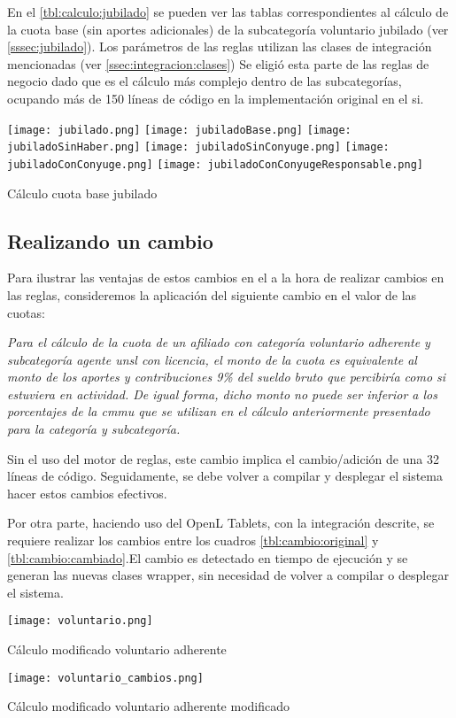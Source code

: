 En el \cref{tbl:calculo:jubilado} se pueden ver las tablas correspondientes al cálculo de la cuota base (sin aportes adicionales) de la subcategoría voluntario jubilado (ver \cref{sssec:jubilado}). Los parámetros de las reglas utilizan las clases de integración mencionadas (ver \cref{ssec:integracion:clases}) Se eligió esta parte de las reglas de negocio dado que es el cálculo más complejo dentro de las subcategorías, ocupando más de 150 líneas de código en la implementación original en el \acrshort{si}.

\begin{table*}
    \centering
    \texttt{[image: jubilado.png]}
    \texttt{[image: jubiladoBase.png]}
    \texttt{[image: jubiladoSinHaber.png]}
    \texttt{[image: jubiladoSinConyuge.png]}
    \texttt{[image: jubiladoConConyuge.png]}
    \texttt{[image: jubiladoConConyugeResponsable.png]}
    \caption{Cálculo cuota base jubilado}
    \label{tbl:calculo:jubilado}
\end{table*}

\subsection{Realizando un cambio}
Para ilustrar las ventajas de estos cambios en el \SIDOSPU a la hora de realizar cambios en las reglas, consideremos la aplicación del siguiente cambio en el valor de las cuotas:

\emph{
Para el cálculo de la cuota de un afiliado con categoría voluntario adherente y subcategoría agente \acrshort{unsl} con licencia, el monto de la cuota es equivalente al monto de los aportes y contribuciones 9\% del sueldo bruto que percibiría como si estuviera en actividad. De igual forma, dicho monto no puede ser inferior a los porcentajes de la \acrshort{cmmu} que se utilizan en el cálculo anteriormente presentado para la categoría y subcategoría.
}

Sin el uso del motor de reglas, este cambio implica el cambio/adición de una 32 líneas de código. Seguidamente, se debe volver a compilar y desplegar el sistema hacer estos cambios efectivos.

Por otra parte, haciendo uso del OpenL Tablets, con la integración descrite, se requiere realizar los cambios entre los cuadros \ref{tbl:cambio:original} y \ref{tbl:cambio:cambiado}.El cambio es detectado en tiempo de ejecución y se generan las nuevas clases wrapper, sin necesidad de volver a compilar o desplegar el sistema.

\begin{table*}
    \centering
    \texttt{[image: voluntario.png]}
    \caption{Cálculo modificado voluntario adherente}
    \label{tbl:cambio:original}
\end{table*}

\begin{table*}
    \centering
    \texttt{[image: voluntario\_cambios.png]}
    \caption{Cálculo modificado voluntario adherente modificado}
    \label{tbl:cambio:cambiado}
\end{table*}
